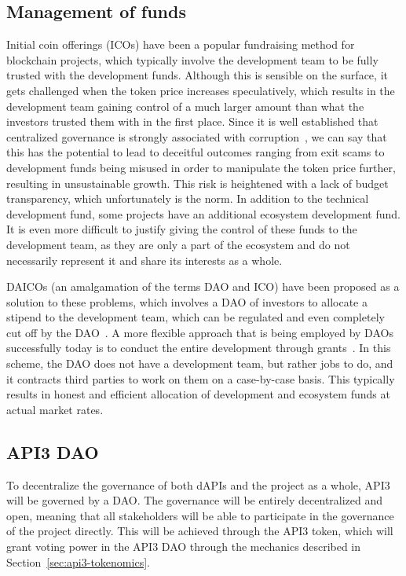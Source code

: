 \documentclass[11pt]{article}
\begin{document}
\subsection{Management of funds}
\label{sec:management-of-funds}

Initial coin offerings (ICOs) have been a popular fundraising method for blockchain projects, which typically involve the development team to be fully trusted with the development funds.
Although this is sensible on the surface, it gets challenged when the token price increases speculatively, which results in the development team gaining control of a much larger amount than what the investors trusted them with in the first place.
Since it is well established that centralized governance is strongly associated with corruption~\cite{fisman:2002}, we can say that this has the potential to lead to deceitful outcomes ranging from exit scams to development funds being misused in order to manipulate the token price further, resulting in unsustainable growth.
This risk is heightened with a lack of budget transparency, which unfortunately is the norm.
In addition to the technical development fund, some projects have an additional ecosystem development fund.
It is even more difficult to justify giving the control of these funds to the development team, as they are only a part of the ecosystem and do not necessarily represent it and share its interests as a whole.

DAICOs (an amalgamation of the terms DAO and ICO) have been proposed as a solution to these problems, which involves a DAO of investors to allocate a stipend to the development team, which can be regulated and even completely cut off by the DAO~\cite{buterin:2018}.
A more flexible approach that is being employed by DAOs successfully today is to conduct the entire development through grants~\cite{dxdao:2019}.
In this scheme, the DAO does not have a development team, but rather jobs to do, and it contracts third parties to work on them on a case-by-case basis.
This typically results in honest and efficient allocation of development and ecosystem funds at actual market rates.

\subsection{API3 DAO}
\label{sec:api3-dao}

To decentralize the governance of both dAPIs and the project as a whole, API3 will be governed by a DAO.
The governance will be entirely decentralized and open, meaning that all stakeholders will be able to participate in the governance of the project directly.
This will be achieved through the API3 token, which will grant voting power in the API3 DAO through the mechanics described in Section~\ref{sec:api3-tokenomics}.
\end{document}

